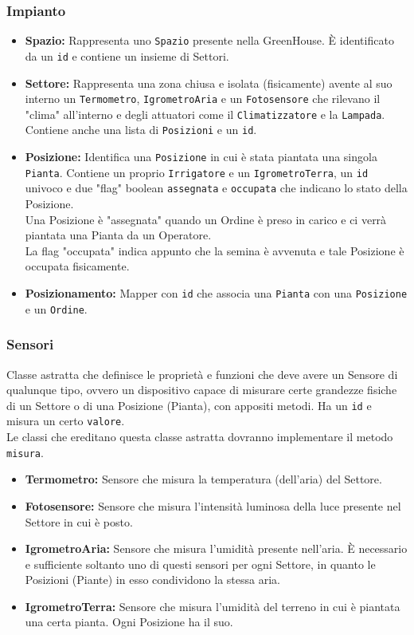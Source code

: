 \documentclass{article}
\newcommand{\code}[1]{\texttt{#1}}
\begin{document}
\subsubsection{Impianto}
\begin{itemize}
    \item \textbf{Spazio:}
    Rappresenta uno \code{Spazio} presente nella GreenHouse.
    È identificato da un \code{id} e contiene un insieme di Settori.
    \item \textbf{Settore:}
    Rappresenta una zona chiusa e isolata (fisicamente) avente al suo interno un \code{Termometro}, \code{IgrometroAria} e un \code{Fotosensore} che rilevano il "clima" all'interno e degli attuatori come il \code{Climatizzatore} e la \code{Lampada}. Contiene anche una lista di \code{Posizioni} e un \code{id}.
    \item \textbf{Posizione:}
    Identifica una \code{Posizione} in cui è stata piantata una singola \code{Pianta}.
    Contiene un proprio \code{Irrigatore} e un \code{IgrometroTerra}, un \code{id} univoco e due "flag" boolean \code{assegnata} e \code{occupata} che indicano lo stato della Posizione.\\
    Una Posizione è "assegnata" quando un Ordine è preso in carico e ci verrà piantata una Pianta da un Operatore.\\
    La flag "occupata" indica appunto che la semina è avvenuta e tale Posizione è occupata fisicamente.
    \item \textbf{Posizionamento:}
    Mapper con \code{id} che associa una \code{Pianta} con una \code{Posizione} e un \code{Ordine}.
\end{itemize}

\subsubsection{Sensori}
Classe astratta che definisce le proprietà e funzioni che deve avere un Sensore di qualunque tipo, ovvero un dispositivo capace di misurare certe grandezze fisiche di un Settore o di una Posizione (Pianta), con appositi metodi. Ha un \code{id} e misura un certo \code{valore}.\\
Le classi che ereditano questa classe astratta dovranno implementare il metodo \code{misura}.

\begin{itemize}
    \item \textbf{Termometro:}
    Sensore che misura la temperatura (dell'aria) del Settore.
    \item \textbf{Fotosensore:}
    Sensore che misura l'intensità luminosa della luce presente nel Settore in cui è posto.
    \item \textbf{IgrometroAria:}
    Sensore che misura l'umidità presente nell'aria. È necessario e sufficiente soltanto uno di questi sensori per ogni Settore, in quanto le Posizioni (Piante) in esso condividono la stessa aria.    
    \item \textbf{IgrometroTerra:}
    Sensore che misura l'umidità del terreno in cui è piantata una certa pianta. Ogni Posizione ha il suo.
\end{itemize}
\end{document}
